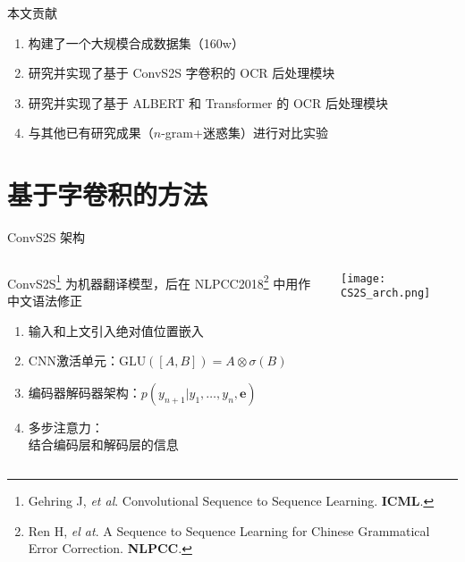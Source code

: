 \begin{frame}[c]{本文贡献}
	\begin{enumerate}
		\item 构建了一个大规模合成数据集（160w）
		\item 研究并实现了基于 ConvS2S 字卷积的 OCR 后处理模块
		\item 研究并实现了基于 ALBERT 和 Transformer 的 OCR 后处理模块
		\item 与其他已有研究成果（$n$-­gram+迷惑集）进行对比实验
	\end{enumerate}
\end{frame}

\section{基于字卷积的方法}

\begin{frame}[c]{ConvS2S 架构}
	\begin{columns}[t]
		\begin{column}[T]{5cm}
			{\footnotesize ConvS2S\footnote{Gehring J, \textit{et al}. Convolutional Sequence to Sequence Learning. \textbf{ICML}.} 为机器翻译模型，后在 NLPCC2018\footnote{{\fontsize{7}{7} \selectfont Ren H, \textit{el at}. A Sequence to Sequence Learning for Chinese Gram­matical Error Correction. \textbf{NLPCC}.}} 中用作中文语法修正}
			\begin{enumerate}
				\item {\footnotesize 输入和上文引入绝对值位置嵌入}
				\item {\footnotesize CNN激活单元：$\text{GLU}([A, B]) = A \otimes \sigma(B)$}
				\item {\footnotesize 编码器解码器架构：$p(y_{n+1}|y_1,\dots,y_n,\textbf{e})$}
				\item {\footnotesize 多步注意力：\\ 结合编码层和解码层的信息}
			\end{enumerate}
		\end{column}
		\begin{column}[T]{6cm}
			\vspace{-2.5em}
			\texttt{[image: CS2S\_arch.png]}
		\end{column}
	\end{columns}
\end{frame}

